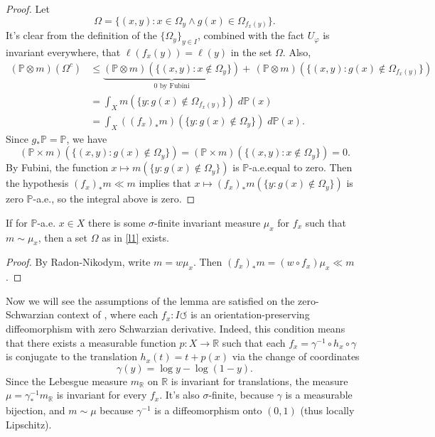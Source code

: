 \documentclass[b5paper]{report}
\begin{document}
\begin{proof}
  Let \[\Omega = \{ (x,y) : x \in \Omega_y \land g(x) \in \Omega_{f_x(y)} \}.\] It's clear from the definition of the \(\{ \Omega_y \}_{y \in I}\), combined with the fact \(U_{\varphi}\) is invariant everywhere, that \(\ell(f_x(y)) = \ell(y)\) in the set \(\Omega\). Also,
  \allowdisplaybreaks
  \begin{align*}
    (\mathbb{P} \otimes m)(\Omega^c) &\leq \underbrace{(\mathbb{P} \otimes m) (\{ (x,y) : x \notin \Omega_y \})}_{0\text{ by Fubini}} +\, (\mathbb{P} \otimes m)(\{ (x,y) : g(x) \notin \Omega_{f_x(y)} \})\\
                 &=  \int_X m (\{ y : g(x) \notin \Omega_{f_x(y)} \}) \;d \mathbb{P}(x)\\
                 &=  \int_X ((f_x)_*m) (\{ y : g(x) \notin \Omega_{y} \}) \;d \mathbb{P}(x).
  \end{align*}
  Since \(g_* \mathbb{P} = \mathbb{P}\), we have \[(\mathbb{P} \times m)(\{ (x,y) : g(x) \notin \Omega_y \}) =(\mathbb{P} \times m)(\{ (x,y) : x \notin \Omega_y \}) = 0.\]
  By Fubini, the function \(x \mapsto m(\{ y : g(x) \notin \Omega_y \})\) is \(\mathbb{P}\)-a.e.\@ equal to zero. Then the hypothesis \((f_x)_*m \ll m\) implies that \(x \mapsto (f_x)_*m(\{ y : g(x) \notin \Omega_y \})\) is zero \(\mathbb{P}\)-a.e., so the integral above is zero.
\end{proof}

\begin{corollary}
  If for \(\mathbb{P}\)-a.e. \(x \in X\) there is some \(\sigma\)-finite invariant measure \(\mu_x\) for \(f_x\) such that \(m \sim \mu_x\), then a set \(\Omega\) as in \cref{l1} exists.
\end{corollary}

\begin{proof}
  By Radon-Nikodym, write \(m = w \mu_x\). Then \((f_x)_*m = (w \circ f_x)\mu_x \ll m\).
\end{proof}

Now we will see the assumptions of the lemma are satisfied on the zero-Schwarzian context of \cite{bonifantSchwarzianDerivativesCylinder2008}, where each \(f_x \colon I \circlearrowleft\) is an orientation-preserving diffeomorphism with zero Schwarzian derivative. Indeed, this condition means that there exists a measurable function \(p \colon X \to \mathbb{R}\) such that each \(f_x = \gamma ^{-1} \circ h_x \circ \gamma\) is conjugate to the translation \(h_x(t) = t + p(x)\) via the change of coordinates
\begin{equation*}
  \gamma(y) = \log y - \log (1 - y).
\end{equation*}
Since the Lebesgue measure \(m_{\mathbb{R}}\) on \(\mathbb{R}\) is invariant for translations, the measure \(\mu = \gamma ^{-1}_* m_{\mathbb{R}}\) is invariant for every \(f_x\). It's also \(\sigma\)-finite, because \(\gamma\) is a measurable bijection, and \(m \sim \mu\) because \(\gamma ^{-1}\) is a diffeomorphism onto \((0,1)\) (thus locally Lipschitz).
\end{document}
